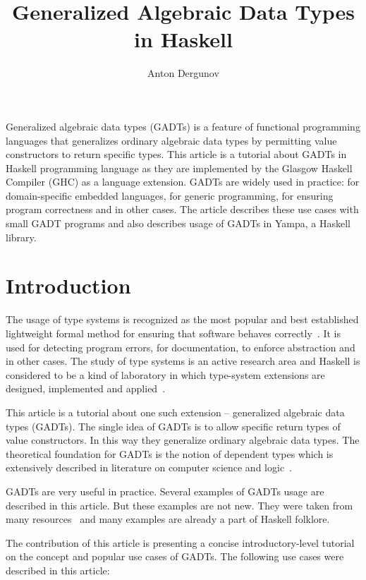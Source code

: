 \documentclass{tmr}
\title{Generalized Algebraic Data Types in Haskell}
\author{Anton Dergunov\email{anton.dergunov@gmail.com}}
\begin{document}
\begin{introduction}

Generalized algebraic data types (GADTs) is a feature of functional programming languages that generalizes ordinary algebraic data types by permitting value constructors to return specific types. This article is a tutorial about GADTs in Haskell programming language as they are implemented by the Glasgow Haskell Compiler (GHC) as a language extension. GADTs are widely used in practice: for domain-specific embedded languages, for generic programming, for ensuring program correctness and in other cases. The article describes these use cases with small GADT programs and also describes usage of GADTs in Yampa, a Haskell library.

\end{introduction}

\section{Introduction}

The usage of type systems is recognized as the most popular and best established lightweight formal method for ensuring that software behaves correctly~\cite{pierce_book}. It is used for detecting program errors, for documentation, to enforce abstraction and in other cases. The study of type systems is an active research area and Haskell is considered to be a kind of laboratory in which type-system extensions are designed, implemented and applied~\cite{haskell_history}.

This article is a tutorial about one such extension -- generalized algebraic data types (GADTs). The single idea of GADTs is to allow specific return types of value constructors. In this way they generalize ordinary algebraic data types. The theoretical foundation for GADTs is the notion of dependent types which is extensively described in literature on computer science and logic~\cite{pierce_book}.

GADTs are very useful in practice. Several examples of GADTs usage are described in this article. But these examples are not new. They were taken from many resources~\cite{fun_with_phantom_types,replib,singletons,okasaki_red_black_trees,weirich_dependently_typed,finally_tagless,yampa_gadts} and many examples are already a part of Haskell folklore.

The contribution of this article is presenting a concise introductory-level tutorial on the concept and popular use cases of GADTs. The following use cases were described in this article:
\end{document}

